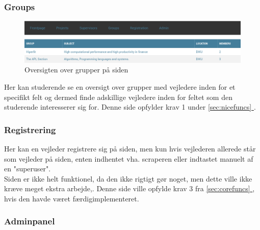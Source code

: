 \documentclass[12pt]{article}
\begin{document}
\subsubsection{Groups}
\begin{figure}[H]
    \centering
    \includegraphics[scale=0.33]{frontend_groups.png}
    \caption{Oversigten over grupper på siden}
    \label{fig:frontend_groups}
\end{figure}
Her kan studerende se en oversigt over grupper med vejledere inden for et specifikt felt og dermed finde adskillige vejledere inden for feltet som den studerende interesserer sig for.
Denne side opfylder krav 1 under \hyperref[sec:nicefuncs]{\ref*{sec:nicefuncs} }.

\subsubsection{Registrering}
Her kan en vejleder registrere sig på siden, men kun hvis vejlederen allerede står som vejleder på siden, enten indhentet vha. scraperen eller indtastet manuelt af en "superuser".\\
Siden er ikke helt funktionel, da den ikke rigtigt gør noget, men dette ville ikke kræve meget ekstra arbejde,.
Denne side ville opfylde krav 3 fra \hyperref[sec:corefuncs]{\ref*{sec:corefuncs} }, hvis den havde været færdigimplementeret.\\

\subsubsection{Adminpanel}

\newpage
\end{document}
